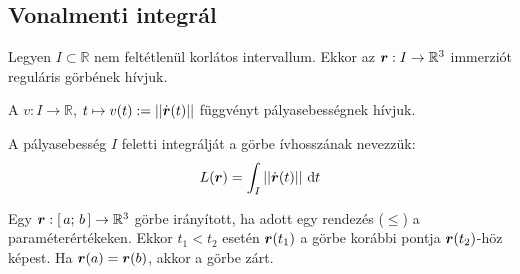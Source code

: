 \documentclass[main.tex]{subfiles}
\begin{document}
\pagebreak
{}
\pagebreak

\subsection{Vonalmenti integrál}


Legyen $I \subset \mathbb{R}$ nem feltétlenül korlátos intervallum.
Ekkor az $\boldsymbol{r} : I \rightarrow \mathbb{R}^3$ immerziót
reguláris görbének hívjuk.




A $v : I \rightarrow \mathbb{R}$,
$t \mapsto v(t) := \left|\left| \dot{\boldsymbol{r}}(t) \right|\right|$
függvényt pályasebességnek hívjuk.




A pályasebesség $I$ feletti integrálját a
görbe ívhosszának nevezzük:
\begin{equation*}
  L(\boldsymbol{r}) = \int_I \left|\left| \dot{\boldsymbol{r}}(t) \right|\right| \, \mathrm{d} t
\end{equation*}




Egy $\boldsymbol{r} : [ \, a; \, b \,] \rightarrow \mathbb{R}^3$ görbe
irányított, ha adott egy rendezés ($\leq$) a paraméterértékeken.
Ekkor $t_1 < t_2$ esetén $\boldsymbol{r}(t_1)$ a görbe korábbi
pontja $\boldsymbol{r}(t_2)$-höz képest. Ha $\boldsymbol{r}(a) = \boldsymbol{r}(b)$,
akkor a görbe zárt.



\end{document}
